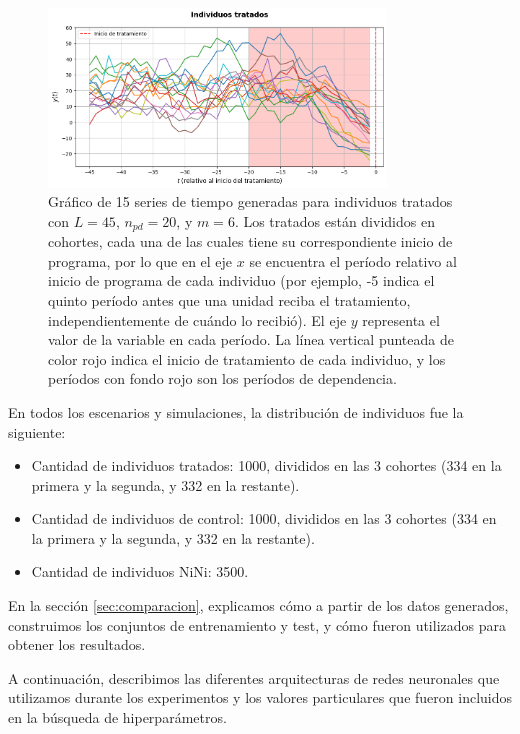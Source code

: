 \documentclass[../../main.tex]{subfiles}
\begin{document}
\begin{figure}[ht]
    \centering
    \includegraphics[width=0.8\textwidth]{figs/tratados_exp1_sim13.png}
    \caption{Gráfico de 15 series de tiempo generadas para individuos tratados con
    \(L=45\), \(n_{pd}=20\), y \(m=6\). Los tratados están divididos en cohortes, cada una
    de las cuales tiene su correspondiente inicio de programa, por lo que en el eje \(x\)
    se encuentra el período relativo al inicio de programa de cada individuo (por ejemplo,
    -5 indica el quinto período antes que una unidad reciba el tratamiento,
    independientemente de cuándo lo recibió). El eje \(y\) representa el valor de la
    variable en cada período. La línea vertical punteada de color rojo indica el inicio de
    tratamiento de cada individuo, y los períodos con fondo rojo son los períodos de
    dependencia.}
    \label{fig:treated_series_example}
\end{figure}

En todos los escenarios y simulaciones, la distribución de individuos fue la siguiente:
\begin{itemize}[noitemsep]
    \item Cantidad de individuos tratados: 1000, divididos en las 3 cohortes (334 en la
    primera y la segunda, y 332 en la restante).
    \item Cantidad de individuos de control: 1000, divididos en las 3 cohortes (334 en la
    primera y la segunda, y 332 en la restante).
    \item Cantidad de individuos NiNi: 3500.
\end{itemize}

En la sección \ref{sec:comparacion}, explicamos cómo a partir de los datos generados,
construimos los conjuntos de entrenamiento y test, y cómo fueron utilizados para obtener
los resultados.

A continuación, describimos las diferentes arquitecturas de redes neuronales que
utilizamos durante los experimentos y los valores particulares que fueron incluidos en la
búsqueda de hiperparámetros.
\end{document}
